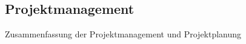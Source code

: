 \documentclass[../../main.tex]{subfiles}
\begin{document}
\subsection{Projektmanagement}

Zusammenfassung der Projektmanagement und Projektplanung 
\end{document}
